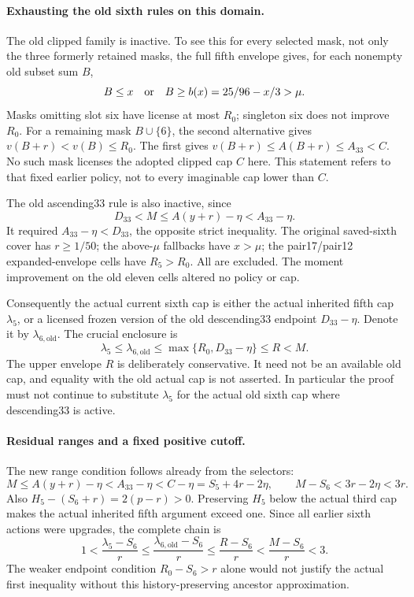 \paragraph{Exhausting the old sixth rules on this domain.}
The old clipped family is inactive. To see this for every selected
mask, not only the three formerly retained masks, the full fifth
envelope gives, for each nonempty old subset sum $B$,
\[
 B\le x\quad\hbox{or}\quad B\ge b(x)=25/96-x/3>\mu.
\]
Masks omitting slot six have license at most $R_0$; singleton six
does not improve $R_0$. For a remaining mask $B\cup\{6\}$, the
second alternative gives $v(B+r)<v(B)\le R_0$. The first gives
$v(B+r)\le A(B+r)\le A_{33}<C$. No such mask licenses the adopted
clipped cap $C$ here. This statement refers to that fixed earlier
policy, not to every imaginable cap lower than $C$.

The old ascending33 rule is also inactive, since
\[
 D_{33}<M\le A(y+r)-\eta<A_{33}-\eta.
\]
It required $A_{33}-\eta<D_{33}$, the opposite strict inequality.
The original saved-sixth cover has $r\ge1/50$; the above-$\mu$
fallbacks have $x>\mu$; the pair17/pair12 expanded-envelope cells
have $R_5>R_0$. All are excluded. The moment improvement on the
old eleven cells altered no policy or cap.

Consequently the actual current sixth cap is either the actual
inherited fifth cap $\lambda_5$, or a licensed frozen version of
the old descending33 endpoint $D_{33}-\eta$. Denote it by
$\lambda_{6,\mathrm{old}}$. The crucial enclosure is
\begin{equation}\label{eq:tent34-actual-old-sixth-bound}
 \lambda_5\le\lambda_{6,\mathrm{old}}
 \le\max\{R_0,D_{33}-\eta\}\le R<M.
\end{equation}
The upper envelope $R$ is deliberately conservative. It need not be
an available old cap, and equality with the old actual cap is not
asserted. In particular the proof must not continue to substitute
$\lambda_5$ for the actual old sixth cap where descending33 is active.

\paragraph{Residual ranges and a fixed positive cutoff.}
The new range condition follows already from the selectors:
\[
 M\le A(y+r)-\eta<A_{33}-\eta<C-\eta
       =S_5+4r-2\eta,
 \qquad M-S_6<3r-2\eta<3r.
\]
Also $H_5-(S_6+r)=2(p-r)>0$. Preserving $H_5$ below the actual
third cap makes the actual inherited fifth argument exceed one.
Since all earlier sixth actions were upgrades, the complete chain is
\begin{equation}\label{eq:tent34-residual-range}
 1<\frac{\lambda_5-S_6}{r}
 \le\frac{\lambda_{6,\mathrm{old}}-S_6}{r}
 \le\frac{R-S_6}{r}<\frac{M-S_6}{r}<3.
\end{equation}
The weaker endpoint condition $R_0-S_6>r$ alone would not justify
the actual first inequality without this history-preserving
ancestor approximation.

